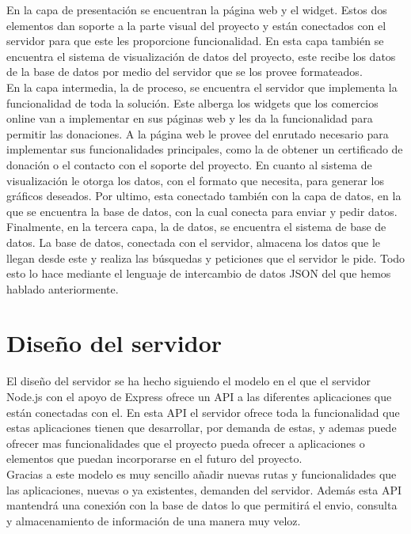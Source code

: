 En la capa de presentación se encuentran la página web y el widget. Estos dos elementos dan soporte a la parte visual del proyecto y están conectados con el servidor para que este les proporcione funcionalidad. En esta capa también se encuentra el sistema de visualización de datos del proyecto, este recibe los datos de la base de datos por medio del servidor que se los provee formateados.\\

En la capa intermedia, la de proceso, se encuentra el servidor que implementa la funcionalidad de toda la solución. Este alberga los widgets que los comercios online van a implementar en sus páginas web y les da la funcionalidad para permitir las donaciones. A la página web le provee del enrutado necesario para implementar sus funcionalidades principales, como la de obtener un certificado de donación o el contacto con el soporte del proyecto. En cuanto al sistema de visualización le otorga los datos, con el formato que necesita, para generar los gráficos deseados. Por ultimo, esta conectado también con la capa de datos, en la que se encuentra la base de datos, con la cual conecta para enviar y pedir datos.\\

Finalmente, en la tercera capa, la de datos, se encuentra el sistema de base de datos. La base de datos, conectada con el servidor, almacena los datos que le llegan desde este y realiza las búsquedas y peticiones que el servidor le pide. Todo esto lo hace mediante el lenguaje de intercambio de datos JSON del que hemos hablado anteriormente.


\section{Diseño del servidor}
El diseño del servidor se ha hecho siguiendo el modelo en el que el servidor Node.js con el apoyo de Express ofrece un API a las diferentes aplicaciones que están conectadas con el. En esta API el servidor ofrece toda la funcionalidad que estas aplicaciones tienen que desarrollar, por demanda de estas, y ademas puede ofrecer mas funcionalidades que el proyecto pueda ofrecer a aplicaciones o elementos que puedan incorporarse en el futuro del proyecto.\\

Gracias a este modelo es muy sencillo añadir nuevas rutas y funcionalidades que las aplicaciones, nuevas o ya existentes, demanden del servidor. Además esta API mantendrá una conexión con la base de datos lo que permitirá el envio, consulta y almacenamiento de información de una manera muy veloz.\\

